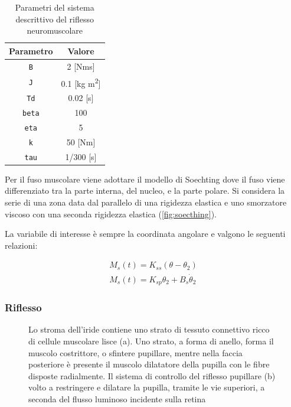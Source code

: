 \begin{table}[t!]
	\centering
	\begin{tabular}{|c|c|}
		\hline
		Parametro & Valore \\
		\hline
		\texttt{B} & 2 [Nms] \\
		\hline
		\texttt{J} & 0.1 [kg m\textsuperscript{2}] \\
		\hline
		\texttt{Td} & 0.02 [s] \\
		\hline
		\texttt{beta} & 100 \\
		\hline
		\texttt{eta} & 5 \\
		\hline
		\texttt{k} & 50 [Nm] \\
		\hline
		\texttt{tau} & 1/300 [s] \\
		\hline
	\end{tabular}
	\caption{Parametri del sistema descrittivo del riflesso neuromuscolare}
	\label{tab:parametriMuscolo}
\end{table}


Per il fuso muscolare viene adottare il modello di Soechting \cite{mains_model_1971} dove il fuso viene differenziato tra la parte interna, del nucleo, e la parte polare. Si considera la serie di una zona data dal parallelo di una rigidezza elastica e uno smorzatore viscoso con una seconda rigidezza elastica (\cref{fig:soecthing}).

La variabile di interesse è sempre la coordinata angolare e valgono le seguenti relazioni:

\begin{equation}
	\begin{gathered}
		M_{s}(t)=K_{s s}\left(\theta-\theta_{2}\right) \\
		M_{s}(t)=K_{s p}  \theta_{2}+B_{s} \dot{\theta}_{2}
	\end{gathered}
\end{equation}

\subsubsection{Riflesso}

\begin{figure}[t!]
	\centering
	\begin{subfigure}{0.6\linewidth}
		\centering
		\tiny{\def\svgwidth{0.95\linewidth}
			}
		\caption{}
	\end{subfigure}\hfill
	\begin{subfigure}{0.4\linewidth}
		\centering
		\tiny{\def\svgwidth{0.95\linewidth}
			}
		\caption{}
	\end{subfigure}
	\caption{Lo stroma dell'iride contiene uno strato di tessuto connettivo ricco di cellule muscolare lisce (a). Uno strato, a forma di anello, forma il muscolo costrittore, o sfintere pupillare, mentre nella faccia posteriore è presente il muscolo dilatatore della pupilla con le fibre disposte radialmente. Il sistema di controllo del riflesso pupillare (b) volto a restringere e dilatare la pupilla, tramite le vie superiori, a seconda del flusso luminoso incidente sulla retina}
	\label{fig:pupilla}
\end{figure}

